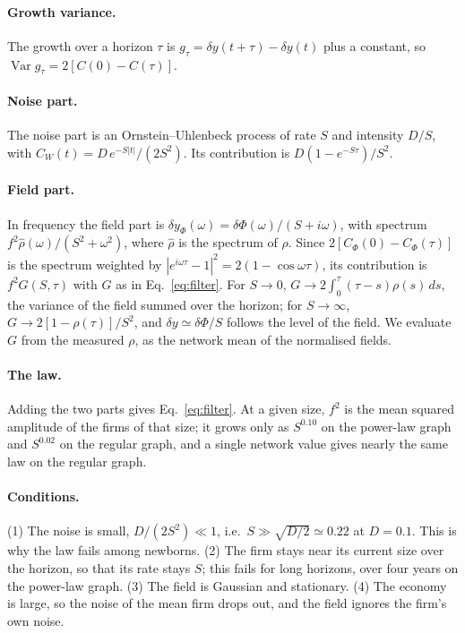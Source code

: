 \documentclass[pre,twocolumn,superscriptaddress,nofootinbib]{revtex4-2}
\newcommand{\Var}{\operatorname{Var}}
\begin{document}
\paragraph{Growth variance.}  The growth over a horizon $\tau$ is $g_\tau=\delta y(t+\tau)-\delta y(t)$ plus a
constant, so $\Var g_\tau=2[C(0)-C(\tau)]$.

\paragraph{Noise part.}  The noise part is an Ornstein--Uhlenbeck process of rate $S$ and intensity $D/S$, with
$C_W(t)=D\,e^{-S|t|}/(2S^2)$.  Its contribution is $D(1-e^{-S\tau})/S^2$.

\paragraph{Field part.}  In frequency the field part is $\delta y_\Phi(\omega)=\delta\Phi(\omega)/(S+i\omega)$,
with spectrum $f^2\hat\rho(\omega)/(S^2+\omega^2)$, where $\hat\rho$ is the spectrum of $\rho$.  Since
$2[C_\Phi(0)-C_\Phi(\tau)]$ is the spectrum weighted by $|e^{i\omega\tau}-1|^2=2(1-\cos\omega\tau)$, its contribution
is $f^2G(S,\tau)$ with $G$ as in Eq.~\eqref{eq:filter}.  For $S\to0$, $G\to2\int_0^\tau(\tau-s)\rho(s)\,ds$, the
variance of the field summed over the horizon; for $S\to\infty$, $G\to2[1-\rho(\tau)]/S^2$, and $\delta y\simeq\delta\Phi/S$
follows the level of the field.  We evaluate $G$ from the measured $\rho$, as the network mean of the normalised
fields.

\paragraph{The law.}  Adding the two parts gives Eq.~\eqref{eq:filter}.  At a given size, $f^2$ is the mean squared
amplitude of the firms of that size; it grows only as $S^{0.10}$ on the power-law graph and $S^{0.02}$ on the regular
graph, and a single network value gives nearly the same law on the regular graph.

\paragraph{Conditions.}  (1) The noise is small, $D/(2S^2)\ll1$, i.e.\ $S\gg\sqrt{D/2}\simeq0.22$ at $D=0.1$.  This is
why the law fails among newborns.  (2) The firm stays near its current size over the horizon, so that its rate stays
$S$; this fails for long horizons, over four years on the power-law graph.  (3) The field is Gaussian and stationary.
(4) The economy is large, so the noise of the mean firm drops out, and the field ignores the firm's own noise.
\end{document}
